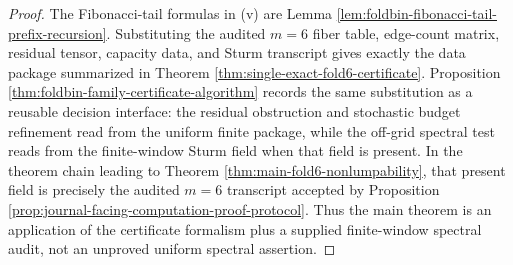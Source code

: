 \begin{proof}
The Fibonacci-tail formulas in \textup{(v)} are Lemma \ref{lem:foldbin-fibonacci-tail-prefix-recursion}.  Substituting the audited \(m=6\) fiber table, edge-count matrix, residual tensor, capacity data, and Sturm transcript gives exactly the data package summarized in Theorem \ref{thm:single-exact-fold6-certificate}.  Proposition \ref{thm:foldbin-family-certificate-algorithm} records the same substitution as a reusable decision interface: the residual obstruction and stochastic budget refinement read from the uniform finite package, while the off-grid spectral test reads from the finite-window Sturm field when that field is present.  In the theorem chain leading to Theorem \ref{thm:main-fold6-nonlumpability}, that present field is precisely the audited \(m=6\) transcript accepted by Proposition \ref{prop:journal-facing-computation-proof-protocol}.  Thus the main theorem is an application of the certificate formalism plus a supplied finite-window spectral audit, not an unproved uniform spectral assertion. \qedhere
\end{proof}


